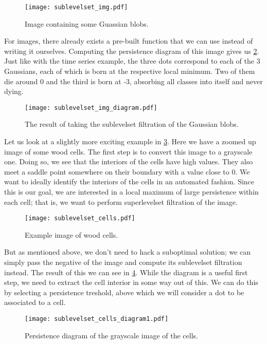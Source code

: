 \begin{figure}[h!]
  \centering
  \texttt{[image: sublevelset\_img.pdf]}
  \caption{Image containing some Guassian blobs.}
  \label{fig:blobs_example}
\end{figure}

For images, there already exists a pre-built function that we can use instead of writing it ourselves. Computing the persistence diagram of this image gives us \ref{fig:blobs_diagram}. Just like with the time series example, the three dots correspond to each of the 3 Gaussians, each of which is born at the respective local minimum. Two of them die around 0 and the third is born at -3, absorbing all classes into itself and never dying.

\begin{figure}[h!]
  \centering
  \texttt{[image: sublevelset\_img\_diagram.pdf]}
  \caption{The result of taking the sublevelset filtration of the Gaussian blobs.}
  \label{fig:blobs_diagram}
\end{figure}

Let us look at a slightly more exciting example in \ref{fig:cells}. Here we have a zoomed up image of some wood cells. The first step is to convert this image to a grayscale one. Doing so, we see that the interiors of the cells have high values. They also meet a saddle point somewhere on their boundary with a value close to 0. We want to ideally identify the interiors of the cells in an automated fashion. Since this is our goal, we are interested in a local maximum of large persistence within each cell; that is, we want to perform superlevelset filtration of the image.

\begin{figure}[h!]
  \centering
  \texttt{[image: sublevelset\_cells.pdf]}
  \caption{Example image of wood cells.}
  \label{fig:cells}
\end{figure}

But as mentioned above, we don't need to hack a suboptimal solution; we can simply pass the negative of the image and compute its sublevelset filtration instead. The result of this we can see in \ref{fig:cells_diagram1}. While the diagram is a useful first step, we need to extract the cell interior in some way out of this. We can do this by selecting a persistence treshold, above which we will consider a dot to be associated to a cell.

\begin{figure}[h!]
  \centering
  \texttt{[image: sublevelset\_cells\_diagram1.pdf]}
  \caption{Persistence diagram of the grayscale image of the cells.}
  \label{fig:cells_diagram1}
\end{figure}

